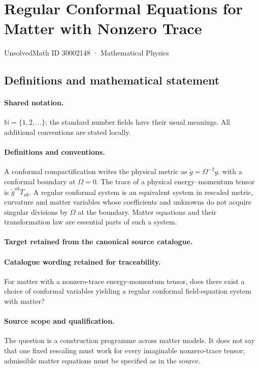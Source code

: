 \documentclass[11pt]{article}
\begin{document}
\setcounter{section}{30002147}
\section{Regular Conformal Equations for Matter with Nonzero Trace}\label{30002148}
{\small UnsolvedMath ID 30002148 · Mathematical Physics}
\subsection{Definitions and mathematical statement}

\paragraph{Shared notation.}$\mathbb N=\{1,2,\ldots\}$; the standard number fields have their usual meanings. All additional conventions are stated locally.


\paragraph{Definitions and conventions.}
A conformal compactification writes the physical metric as $\widetilde g=\Omega^{-2}g$, with a conformal boundary at $\Omega=0$. The trace of a physical energy--momentum tensor is $\widetilde g^{ab}T_{ab}$. A regular conformal system is an equivalent system in rescaled metric, curvature and matter variables whose coefficients and unknowns do not acquire singular divisions by $\Omega$ at the boundary. Matter equations and their transformation law are essential parts of such a system.

\paragraph{Target retained from the canonical source catalogue.}
\paragraph{Catalogue wording retained for traceability.}
For matter with a nonzero-trace energy-momentum tensor, does there exist a choice of conformal variables yielding a regular conformal field-equation system with matter?

\paragraph{Source scope and qualification.}
The question is a construction programme across matter models. It does not say that one fixed rescaling must work for every imaginable nonzero-trace tensor; admissible matter equations must be specified as in the source.
\end{document}
